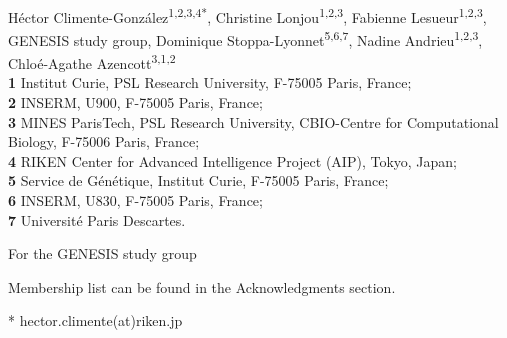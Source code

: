 \documentclass[10pt,letterpaper]{article}
\begin{document}
\vspace*{0.2in}

\begin{flushleft}
{\Large
\textbf{} %
}
\newline
\\
Héctor Climente-González\textsuperscript{1,2,3,4*}, 
Christine Lonjou\textsuperscript{1,2,3}, 
Fabienne Lesueur\textsuperscript{1,2,3},
GENESIS study group\textsuperscript{\textpilcrow},
Dominique Stoppa-Lyonnet\textsuperscript{5,6,7\textcurrency}, 
Nadine Andrieu\textsuperscript{1,2,3}, 
Chloé-Agathe Azencott\textsuperscript{3,1,2}
\\
\bigskip
\textbf{1} Institut Curie, PSL Research University, F-75005 Paris, France;\\
\textbf{2} INSERM, U900, F-75005 Paris, France;\\
\textbf{3} MINES ParisTech, PSL Research University, CBIO-Centre for Computational Biology, F-75006 Paris, France;\\
\textbf{4} RIKEN Center for Advanced Intelligence Project (AIP), Tokyo, Japan; \\
\textbf{5} Service de Génétique, Institut Curie, F-75005 Paris, France;\\
\textbf{6} INSERM, U830, F-75005 Paris, France;\\
\textbf{7} Université Paris Descartes.\\
\bigskip

% 
%


\textcurrency For the GENESIS study group %


\textpilcrow Membership list can be found in the Acknowledgments section.

* hector.climente(at)riken.jp

\end{flushleft}
\end{document}
